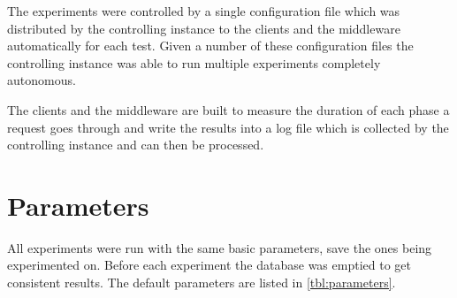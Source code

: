 \documentclass[a4paper, oneside]{csthesis}
\begin{document}
    The experiments were controlled by a single configuration file which was distributed by
    the controlling instance to the clients and the middleware automatically for each test.
    Given a number of these configuration files the controlling instance was able to run multiple
    experiments completely autonomous.
    
    The clients and the middleware are built to measure the duration of each phase a request goes
    through and write the results into a log file which is collected by the controlling instance
    and can then be processed.

\newpage
\section{Parameters}
	All experiments were run with the same basic parameters, save the ones being experimented on.
	Before each experiment the database was emptied to get consistent results.
	The default parameters are listed in \cref{tbl:parameters}.
	
	\begin{table}[hp]
        \centering
        \caption{Default parameters for experiments}
        \label{tbl:parameters}
    \end{table}
\end{document}
